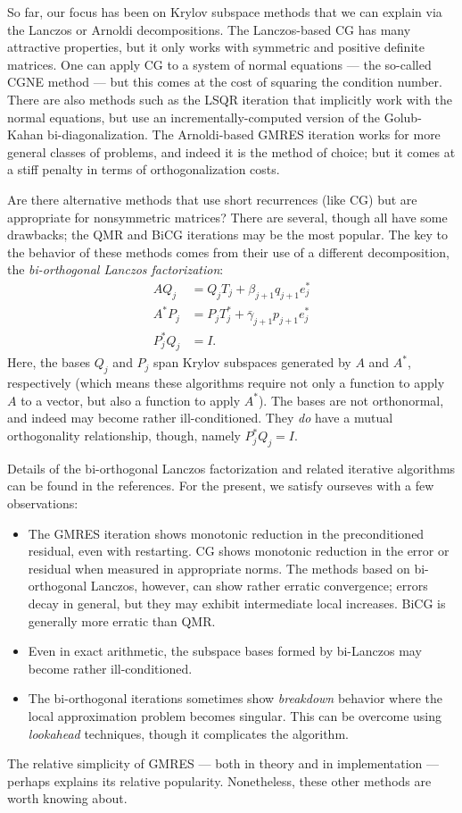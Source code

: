 \documentclass[12pt, leqno]{article} %
\begin{document}
So far, our focus has been on Krylov subspace methods that we can
explain via the Lanczos or Arnoldi decompositions.  The Lanczos-based
CG has many attractive properties, but it only works with symmetric
and positive definite matrices.  One can apply CG to a system of normal
equations --- the so-called CGNE method --- but this comes at the cost
of squaring the condition number.  There are also methods such as the
LSQR iteration that implicitly work with the normal equations, but use
an incrementally-computed version of the Golub-Kahan bi-diagonalization.
The Arnoldi-based GMRES iteration works for more general classes
of problems, and indeed it is the method of choice; but it comes at
a stiff penalty in terms of orthogonalization costs.

Are there alternative methods that use short recurrences (like CG) but
are appropriate for nonsymmetric matrices?  There are several, though
all have some drawbacks; the QMR and BiCG iterations may be the most
popular.  The key to the behavior of these methods comes from their
use of a different decomposition, the {\em bi-orthogonal Lanczos
factorization}:
\begin{align*}
  A Q_j &= Q_j T_j + \beta_{j+1} q_{j+1} e_j^* \\
  A^* P_j &= P_j T_j^* + \bar{\gamma}_{j+1} p_{j+1} e_j^* \\
  P_j^* Q_j &= I.
\end{align*}
Here, the bases $Q_j$ and $P_j$ span Krylov subspaces generated
by $A$ and $A^*$, respectively (which means these algorithms require
not only a function to apply $A$ to a vector, but also a function
to apply $A^*$).  The bases are not orthonormal, and indeed may become
rather ill-conditioned.  They {\em do} have a mutual orthogonality
relationship, though, namely $P_j^* Q_j = I$.

Details of the bi-orthogonal Lanczos factorization and related
iterative algorithms can be found in the references.  For the present,
we satisfy ourseves with a few observations:
\begin{itemize}
\item
  The GMRES iteration shows monotonic reduction in the preconditioned
  residual, even with restarting.  CG shows monotonic reduction in the
  error or residual when measured in appropriate norms.  The methods
  based on bi-orthogonal Lanczos, however, can show rather erratic
  convergence; errors decay in general, but they may exhibit
  intermediate local increases.  BiCG is generally more erratic than
  QMR.
\item
  Even in exact arithmetic, the subspace bases formed by bi-Lanczos
  may become rather ill-conditioned.
\item
  The bi-orthogonal iterations sometimes show {\em breakdown} behavior
  where the local approximation problem becomes singular.  This can be
  overcome using {\em lookahead} techniques, though it complicates the
  algorithm.
\end{itemize}
The relative simplicity of GMRES --- both in theory and in implementation ---
perhaps explains its relative popularity.  Nonetheless, these other methods
are worth knowing about.
\end{document}
